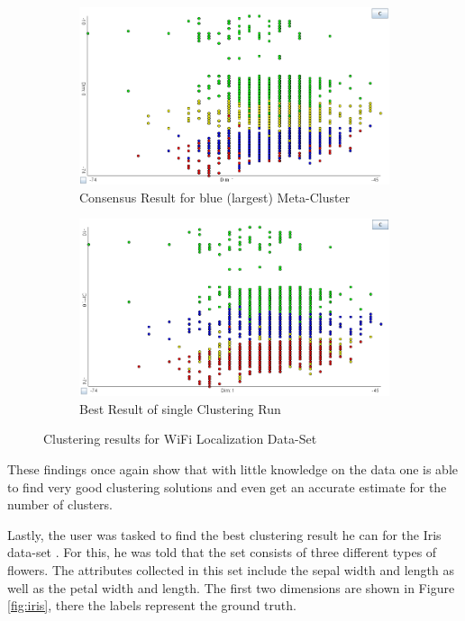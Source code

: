 \documentclass[
	a4paper,
	english,
	twoside,
	openright,               
	11pt                            
	]{report}
\begin{document}
\begin{figure}[h]
\centering
\begin{subfigure}[t]{.49\textwidth}
  \centering
  \includegraphics[width=.95\linewidth]{user_wifi_consensus}
  \caption{Consensus Result for blue (largest) Meta-Cluster}
  \label{fig:user_wifi_consensus}
\end{subfigure}
\hfill
\begin{subfigure}[t]{.49\textwidth}
  \centering
  \includegraphics[width=.95\linewidth]{user_wifi_best}
  \caption{Best Result of single Clustering Run}
  \label{fig:user_wifi_best}
\end{subfigure}

\caption{Clustering results for WiFi Localization Data-Set}
\label{fig:user_wifi}
\end{figure}

These findings once again show that with little knowledge on the data one is able to find very good clustering solutions and even get an accurate estimate for the number of clusters.

Lastly, the user was tasked to find the best clustering result he can for the Iris data-set \cite{Dua:2019}. For this, he was told that the set consists of three different types of flowers. The attributes collected in this set include the sepal width and length as well as the petal width and length. The first two dimensions are shown in Figure \ref{fig:iris}, there the labels represent the ground truth.
\end{document}
